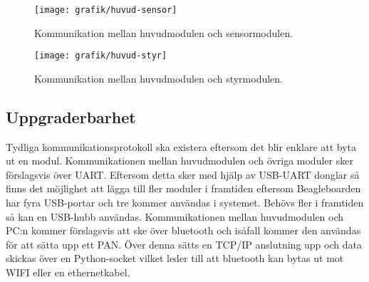 \begin{figure}[h]
\center
\texttt{[image: grafik/huvud-sensor]}
\caption{Kommunikation mellan huvudmodulen och sensormodulen.}
\end{figure}

\begin{figure}[h]
\center
\texttt{[image: grafik/huvud-styr]}
\caption{Kommunikation mellan huvudmodulen och styrmodulen.}
\end{figure}

\subsection{Uppgraderbarhet}
Tydliga kommunikationsprotokoll ska existera eftersom det blir enklare att byta ut en modul. Kommunikationen mellan huvudmodulen och övriga moduler sker förslagsvis över UART. Eftersom detta sker med hjälp av USB-UART donglar så finns det möjlighet att lägga till fler moduler i framtiden eftersom Beagleboarden har fyra USB-portar och tre kommer användas i systemet. Behövs fler i framtiden så kan en USB-hubb användas.
\newline
\newline
Kommunikationen mellan huvudmodulen och PC:n kommer förslagsvis att ske över bluetooth och isåfall kommer den användas för att sätta upp ett PAN. Över denna sätts en TCP/IP anslutning upp och data skickas över en Python-socket vilket leder till att bluetooth kan bytas ut mot WIFI eller en ethernetkabel.
